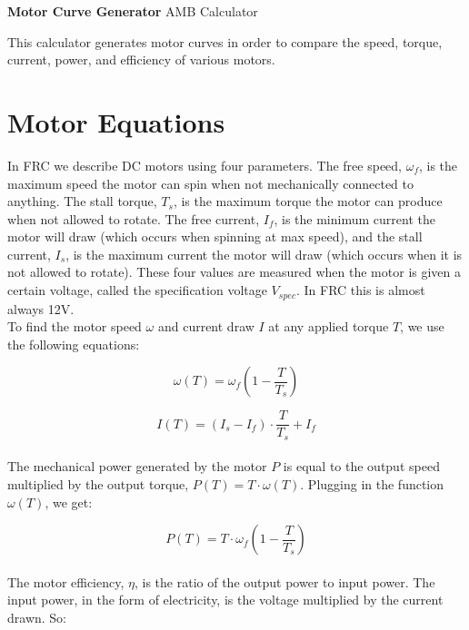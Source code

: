 \documentclass[a4paper]{article}
\begin{document}
	
	\Huge\textbf{Motor Curve Generator}
	\newline
	\LARGE AMB Calculator
	
	\vspace{0.5cm}
	\normalsize
	
	This calculator generates motor curves in order to compare the speed, torque, current, power, and efficiency of various motors.
	
	\section*{Motor Equations}
	
	In FRC we describe DC motors using four parameters. The free speed, $ \omega_f $, is the maximum speed the motor can spin when not mechanically connected to anything. The stall torque, $ T_s $, is the maximum torque the motor can produce when not allowed to rotate. The free current, $ I_f $, is the minimum current the motor will draw (which occurs when spinning at max speed), and the stall current, $ I_s $, is the maximum current the motor will draw (which occurs when it is not allowed to rotate). These four values are measured when the motor is given a certain voltage, called the specification voltage $ V_{spec} $. In FRC this is almost always 12V. \\
	
	To find the motor speed $ \omega $ and current draw $ I $ at any applied torque $ T $, we use the following equations:
	
	\begin{equation} \label{w(T)}
		\omega (T) = \omega_f \left( 1 - \frac{T}{T_s} \right)
	\end{equation}
	
	\begin{equation} \label{I(T)}
		I (T) = \left( I_s - I_f \right) \cdot \frac{T}{T_s} + I_f
	\end{equation}
	\\
	The mechanical power generated by the motor $ P $ is equal to the output speed multiplied by the output torque, $ P(T) = T \cdot \omega (T) $. Plugging in the function $ \omega (T) $, we get:
	
	\begin{equation}
		P (T) = T \cdot \omega_f \left( 1 - \frac{T}{T_s} \right)
	\end{equation}
	\\
	The motor efficiency, $ \eta $, is the ratio of the output power to input power. The input power, in the form of electricity, is the voltage multiplied by the current drawn. So:
	
\end{document}
